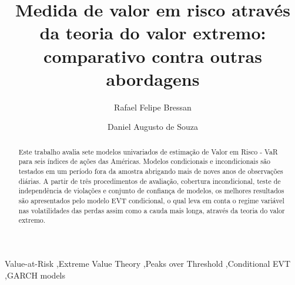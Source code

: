 \documentclass[1p]{elsarticle}
\theoremstyle{definition}
\begin{document}
	
\listoftodos

\begin{frontmatter}

\title{Medida de valor em risco através da teoria do valor extremo:\\comparativo contra outras abordagens}




\author[mymainaddress]{Rafael Felipe Bressan}
%
\author[mymainaddress]{Daniel Augusto de Souza}

\address[mymainaddress]{Avenida Madre Benvenuta, 2007 - Santa Mônica Florianópolis - SC 88035-901}

\begin{abstract}
	Este trabalho avalia sete modelos univariados de estimação de Valor em Risco - VaR para seis índices de ações das Américas. Modelos condicionais e incondicionais são testados em um período fora da amostra abrigando mais de noves anos de observações diárias. A partir de três procedimentos de avaliação, cobertura incondicional, teste de independência de violações e conjunto de confiança de modelos, os melhores resultados são apresentados pelo modelo EVT condicional, o qual leva em conta o regime variável nas volatilidades das perdas assim como a cauda mais longa, através da teoria do valor extremo.
\end{abstract}

\begin{keyword}
Value-at-Risk \sep Extreme Value Theory \sep Peaks over Threshold \sep Conditional EVT \sep GARCH models
\end{keyword}

\end{frontmatter}
\end{document}
